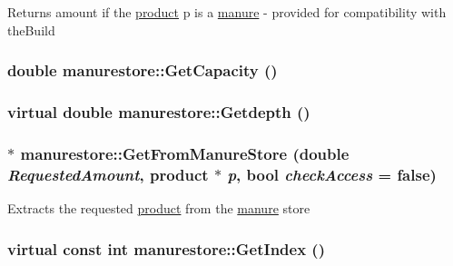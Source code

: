 \label{classmanurestore_a2de53bf7077d84143c1014b1716c9bd8}
Returns amount if the \hyperlink{classproduct}{product} p is a \hyperlink{classmanure}{manure} -\/ provided for compatibility with theBuild \hypertarget{classmanurestore_a154c66c6ccb49a2b8f40554f9a9d24b5}{
\subsubsection[{GetCapacity}]{\setlength{\rightskip}{0pt plus 5cm}double manurestore::GetCapacity ()}}
\label{classmanurestore_a154c66c6ccb49a2b8f40554f9a9d24b5}
\hypertarget{classmanurestore_a40d306f5e212c2fd0a2163afdf5325ce}{
\subsubsection[{Getdepth}]{\setlength{\rightskip}{0pt plus 5cm}virtual double manurestore::Getdepth ()}}
\label{classmanurestore_a40d306f5e212c2fd0a2163afdf5325ce}
\hypertarget{classmanurestore_a0cf324021067f2433337600801c36a59}{
\subsubsection[{GetFromManureStore}]{ $\ast$ manurestore::GetFromManureStore (double {\em RequestedAmount}, \/  {\bf product} $\ast$ {\em p}, \/  bool {\em checkAccess} = {\ttfamily false})}}
\label{classmanurestore_a0cf324021067f2433337600801c36a59}
Extracts the requested \hyperlink{classproduct}{product} from the \hyperlink{classmanure}{manure} store \hypertarget{classmanurestore_abd141ffb5bf592b32f75222527ea80a4}{
\subsubsection[{GetIndex}]{\setlength{\rightskip}{0pt plus 5cm}virtual const int manurestore::GetIndex ()}}
